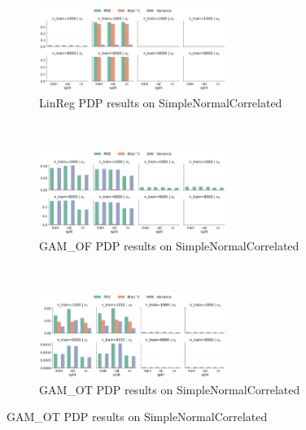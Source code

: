 \documentclass[runningheads]{llncs}
\begin{document}
\begin{figure}[h!]
    \centering
    \begin{subfigure}[b]{\textwidth}
        \centering
        \includegraphics[width=0.67\textwidth]{img/SNC-all/feature_effect_errors_pdp_LinReg.png}
        \caption{LinReg PDP results on SimpleNormalCorrelated}
    \end{subfigure}
    \\[10pt]
    \vfill
    \begin{subfigure}[b]{\textwidth}
        \centering
        \includegraphics[width=0.67\textwidth]{img/SNC-all/feature_effect_errors_pdp_GAM_OF.png}
        \caption{GAM\_OF PDP results on SimpleNormalCorrelated}
    \end{subfigure}
    \\[10pt]
    \vfill
    \begin{subfigure}[b]{\textwidth}
        \centering
        \includegraphics[width=0.67\textwidth]{img/SNC-all/feature_effect_errors_pdp_GAM_OT.png}
        \caption{GAM\_OT PDP results on SimpleNormalCorrelated}
    \end{subfigure}
\end{figure}
\end{document}

